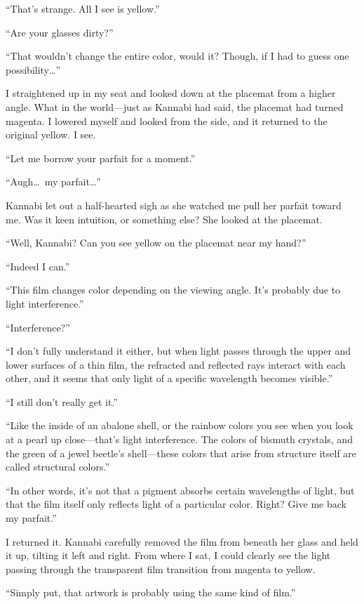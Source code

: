 \documentclass[
    a4paper,
    12pt,
    twoside,
    openany,
    UTF8,
    fontset=windows
]{ctexbook}
\begin{document}
``That's strange. All I see is yellow.''

``Are your glasses dirty?''

``That wouldn't change the entire color, would it? Though, if I had to guess one possibility\dots''

I straightened up in my seat and looked down at the placemat from a higher angle. What in the world---just as Kannabi had said, the placemat had turned magenta. I lowered myself and looked from the side, and it returned to the original yellow. I see.

``Let me borrow your parfait for a moment.''

``Augh\dots\ my parfait\dots''

Kannabi let out a half-hearted sigh as she watched me pull her parfait toward me. Was it keen intuition, or something else? She looked at the placemat.

``Well, Kannabi? Can you see yellow on the placemat near my hand?''

``Indeed I can.''

``This film changes color depending on the viewing angle. It's probably due to light interference.''

``Interference?''

``I don't fully understand it either, but when light passes through the upper and lower surfaces of a thin film, the refracted and reflected rays interact with each other, and it seems that only light of a specific wavelength becomes visible.''

``I still don't really get it.''

``Like the inside of an abalone shell, or the rainbow colors you see when you look at a pearl up close---that's light interference. The colors of bismuth crystals, and the green of a jewel beetle's shell---these colors that arise from structure itself are called structural colors.''

``In other words, it's not that a pigment absorbs certain wavelengths of light, but that the film itself only reflects light of a particular color. Right? Give me back my parfait.''

I returned it. Kannabi carefully removed the film from beneath her glass and held it up, tilting it left and right. From where I sat, I could clearly see the light passing through the transparent film transition from magenta to yellow.

``Simply put, that artwork is probably using the same kind of film.''
\end{document}

